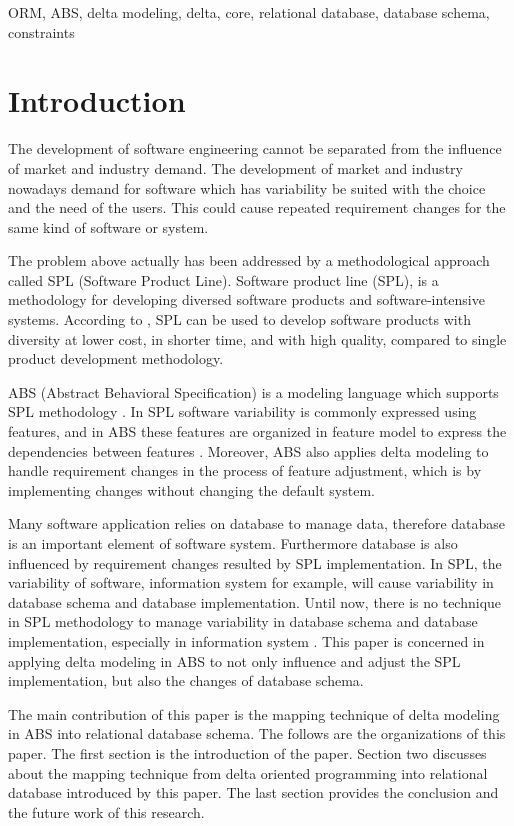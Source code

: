 \documentclass[conference]{IEEEtran}
\begin{document}
\begin{IEEEkeywords}
ORM, ABS, delta modeling, delta, core, relational database, database schema, constraints
\end{IEEEkeywords}


\section{Introduction}
The development of software engineering cannot be separated from the influence of market and industry demand. The development of market and industry nowadays demand for software which has variability be suited with the choice and the need of the users. This could cause repeated requirement changes for the same kind of software or system.

The problem above actually has been addressed by a methodological approach called SPL (Software Product Line). Software product line (SPL), is a methodology for developing diversed software products and software-intensive systems. According to \cite{book1}, SPL can be used to develop software products with diversity at lower cost, in shorter time, and with high quality, compared to single product development methodology.

ABS (Abstract Behavioral Specification) is a modeling language which supports SPL methodology \cite{lncschap}. In SPL software variability is commonly expressed using features, and in ABS these features are organized in feature model to express the dependencies between features \cite{url}. Moreover, ABS also applies delta modeling to handle requirement changes in the process of feature adjustment, which is by implementing changes without changing the default system.

Many software application relies on database to manage data, therefore database is an important element of software system. Furthermore database is also influenced by requirement changes resulted by SPL implementation. In SPL, the variability of software, information system for example, will cause variability in database schema and database implementation. Until now, there is no technique in SPL methodology to manage variability in database schema and database implementation, especially in information system \cite{article}. This paper is concerned in applying delta modeling in ABS to not only influence and adjust the  SPL implementation, but also the changes of database schema.

The main contribution of this paper is the mapping technique of delta modeling in ABS into relational database schema. The follows are the organizations of this paper.
The first section is the introduction of the paper.
Section two discusses about the mapping technique from delta oriented programming into relational database introduced by this paper.
The last section provides the conclusion and the future work of this research.
\end{document}
